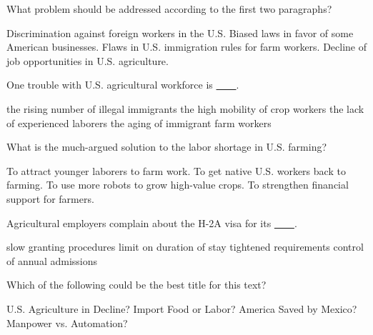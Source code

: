 \item What problem should be addressed according to the first two paragraphs?
\begin{tasks}
	\task Discrimination against foreign workers in the U.S.
	\task Biased laws in favor of some American businesses.
	\task Flaws in U.S. immigration rules for farm workers.
	\task Decline of job opportunities in U.S. agriculture.
\end{tasks}
\item One trouble with U.S. agricultural workforce is \uline{~~~~}.
\begin{tasks}
	\task the rising number of illegal immigrants
	\task the high mobility of crop workers
	\task the lack of experienced laborers
	\task the aging of immigrant farm workers
\end{tasks}
\item What is the much-argued solution to the labor shortage in U.S. farming?
\begin{tasks}
	\task To attract younger laborers to farm work.
	\task To get native U.S. workers back to farming.
	\task To use more robots to grow high-value crops.
	\task To strengthen financial support for farmers.
\end{tasks}
\item Agricultural employers complain about the H-2A visa for its \uline{~~~~}.
\begin{tasks}
	\task slow granting procedures
	\task limit on duration of stay
	\task tightened requirements
	\task control of annual admissions
\end{tasks}
\item Which of the following could be the best title for this text?
\begin{tasks}
	\task U.S. Agriculture in Decline?
	\task Import Food or Labor?
	\task America Saved by Mexico?
	\task Manpower vs. Automation?
\end{tasks}